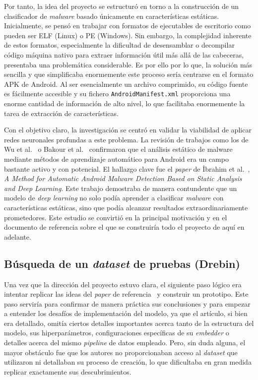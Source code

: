 Por tanto, la idea del proyecto se estructuró en torno a la construcción de un clasificador de \textit{malware} basado únicamente en características estáticas. Inicialmente, se pensó en trabajar con formatos de ejecutables de escritorio como pueden ser ELF (Linux) o PE (Windows). Sin embargo, la complejidad inherente de estos formatos, especialmente la dificultad de desensamblar o decompilar código máquina nativo para extraer información útil más allá de las cabeceras, presentaba una problemática considerable. Es por ello por lo que, la solución más sencilla y que simplificaba enormemente este proceso sería centrarse en el formato APK de Android. Al ser esencialmente un archivo comprimido, su código fuente es fácilmente accesible y su fichero \texttt{AndroidManifest.xml} proporciona una enorme cantidad de información de alto nivel, lo que facilitaba enormemente la tarea de extracción de características.

Con el objetivo claro, la investigación se centró en validar la viabilidad de aplicar redes neuronales profundas a este problema. La revisión de trabajos como los de Wu et al.~\cite{wu2012droidmat} o Bakour et al.~\cite{8566573} confirmaron que el análisis estático de malware mediante métodos de aprendizaje automático para Android era un campo bastante activo y con potencial. El hallazgo clave fue el \textit{paper} de İbrahim et al.~\cite{9936621}, \textit{A Method for Automatic Android Malware Detection Based on Static Analysis and Deep Learning}. Este trabajo demostraba de manera contundente que un modelo de \textit{deep learning} no solo podía aprender a clasificar \textit{malware} con características estáticas, sino que podía alcanzar resultados extraordinariamente prometedores. Este estudio se convirtió en la principal motivación y en el documento de referencia sobre el que se construiría todo el proyecto de aquí en adelante.

\subsection{Búsqueda de un \textit{dataset} de pruebas (Drebin)}

Una vez que la dirección del proyecto estuvo clara, el siguiente paso lógico era intentar replicar las ideas del \textit{paper} de referencia~\cite{9936621} y construir un prototipo. Este paso serviría para confirmar de manera práctica sus conclusiones y para empezar a entender los desafíos de implementación del modelo, ya que el artículo, si bien era detallado, omitía ciertos detalles importantes acerca tanto de la estructura del modelo, sus hiperparámetros, configuraciones específicas de su \textit{embedder} o detalles acerca del mismo \textit{pipeline} de datos empleado. Pero, sin duda alguna, el mayor obstáculo fue que los autores no proporcionaban acceso al \textit{dataset} que utilizaron ni detallaban su proceso de creación, lo que dificultaba en gran medida replicar exactamente sus descubrimientos.

